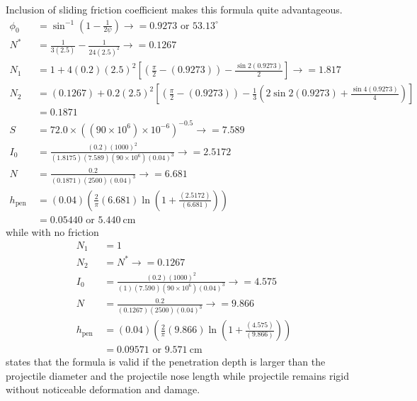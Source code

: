 \documentclass[]{article} %
\begin{document}
Inclusion of sliding friction coefficient makes this formula quite advantageous.
\begin{equation}\nonumber
  \begin{aligned}
  \phi_0 & =\sin ^{-1}\left(1-\frac{1}{2 \psi}\right) \rightarrow=0.9273 \text { or } 53.13^{\circ} \\
  N^* & =\frac{1}{3(2.5)}-\frac{1}{24(2.5)^2} \rightarrow=0.1267 \\
  N_1 & =1+4(0.2)(2.5)^2\left[\left(\frac{\pi}{2}-(0.9273)\right)-\frac{\sin 2(0.9273)}{2}\right] \rightarrow=1.817 \\
  N_2 & =(0.1267)+0.2(2.5)^2\left[\left(\frac{\pi}{2}-(0.9273)\right)-\frac{1}{3}\left(2 \sin 2(0.9273)+\frac{\sin 4(0.9273)}{4}\right)\right] \\
  & =0.1871\\
    S & =72.0 \times\left(\left(90 \times 10^6\right) \times 10^{-6}\right)^{-0.5} \rightarrow=7.589 \\
    I_0 & =\frac{(0.2)(1000)^2}{(1.8175)(7.589)\left(90 \times 10^6\right)(0.04)^3} \rightarrow=2.5172 \\
    N & =\frac{0.2}{(0.1871)(2500)(0.04)^3} \rightarrow=6.681 \\
    h_{\text {pen }} & =(0.04)\left(\frac{2}{\pi}(6.681) \ln \left(1+\frac{(2.5172)}{(6.681)}\right)\right) \\
    & =0.05440 \text { or } 5.440 \mathrm{~cm}
    \end{aligned}
    \end{equation}
while with no friction
\begin{equation}\nonumber
  \begin{aligned}
  N_1 & =1 \\
  N_2 & =N^* \rightarrow=0.1267 \\
  I_0 & =\frac{(0.2)(1000)^2}{(1)(7.590)\left(90 \times 10^6\right)(0.04)^3} \rightarrow=4.575 \\
  N & =\frac{0.2}{(0.1267)(2500)(0.04)^3} \rightarrow=9.866 \\
  h_{\text {pen }} & =(0.04)\left(\frac{2}{\pi}(9.866) \ln \left(1+\frac{(4.575)}{(9.866)}\right)\right) \\
  & =0.09571 \text { or } 9.571 \mathrm{~cm}
  \end{aligned}
  \end{equation}
\cite{chen2002deep} states that the formula is valid if the penetration depth is larger than the projectile diameter and the projectile nose length while projectile remains rigid without noticeable deformation and damage.
\end{document}
